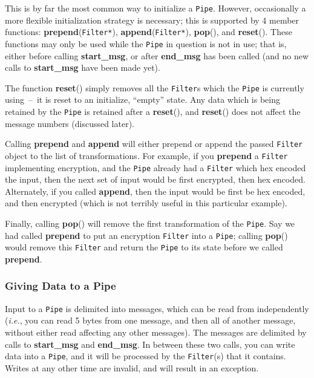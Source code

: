 \documentclass{article}
\newcommand{\function}[1]{\textbf{#1}}
\newcommand{\type}[1]{\texttt{#1}}
\newcommand{\ie}[0]{\emph{i.e.}}
\begin{document}
This is by far the most common way to initialize a \type{Pipe}. However,
occasionally a more flexible initialization strategy is necessary; this is
supported by 4 member functions: \function{prepend}(\type{Filter*}),
\function{append}(\type{Filter*}), \function{pop}(), and \function{reset}().
These functions may only be used while the \type{Pipe} in question is not in
use; that is, either before calling \function{start\_msg}, or after
\function{end\_msg} has been called (and no new calls to \function{start\_msg}
have been made yet).

The function \function{reset}() simply removes all the \type{Filter}s
which the \type{Pipe} is currently using~--~it is reset to an
initialize, ``empty'' state.  Any data which is being retained by the
\type{Pipe} is retained after a \function{reset}(), and
\function{reset}() does not affect the message numbers (discussed
later).

Calling \function{prepend} and \function{append} will either prepend
or append the passed \type{Filter} object to the list of
transformations. For example, if you \function{prepend} a
\type{Filter} implementing encryption, and the \type{Pipe} already had
a \type{Filter} which hex encoded the input, then the next set of
input would be first encrypted, then hex encoded. Alternately, if you
called \function{append}, then the input would be first be hex
encoded, and then encrypted (which is not terribly useful in this
particular example).

Finally, calling \function{pop}() will remove the first transformation
of the \type{Pipe}. Say we had called \function{prepend} to put an
encryption \type{Filter} into a \type{Pipe}; calling \function{pop}()
would remove this \type{Filter} and return the \type{Pipe} to its
state before we called \function{prepend}.

\subsubsection{Giving Data to a Pipe}

Input to a \type{Pipe} is delimited into messages, which can be read from
independently (\ie, you can read 5 bytes from one message, and then all of
another message, without either read affecting any other messages). The
messages are delimited by calls to \function{start\_msg} and
\function{end\_msg}. In between these two calls, you can write data into a
\type{Pipe}, and it will be processed by the \type{Filter}(s) that it
contains. Writes at any other time are invalid, and will result in an
exception.
\end{document}
